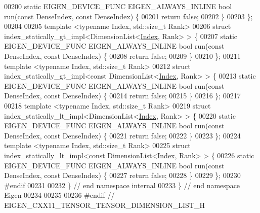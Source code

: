 \begin{DoxyCode}
00200   \textcolor{keyword}{static} EIGEN\_DEVICE\_FUNC EIGEN\_ALWAYS\_INLINE \textcolor{keywordtype}{bool} run(\textcolor{keyword}{const} DenseIndex, \textcolor{keyword}{const} DenseIndex) \{
00201     \textcolor{keywordflow}{return} \textcolor{keyword}{false};
00202   \}
00203 \};
00204 
00205 \textcolor{keyword}{template} <\textcolor{keyword}{typename} Index, std::\textcolor{keywordtype}{size\_t} Rank>
00206 \textcolor{keyword}{struct }index\_statically\_gt\_impl<DimensionList<\hyperlink{namespace_eigen_a62e77e0933482dafde8fe197d9a2cfde}{Index}, Rank> > \{
00207   \textcolor{keyword}{static} EIGEN\_DEVICE\_FUNC EIGEN\_ALWAYS\_INLINE \textcolor{keywordtype}{bool} run(\textcolor{keyword}{const} DenseIndex, \textcolor{keyword}{const} DenseIndex) \{
00208     \textcolor{keywordflow}{return} \textcolor{keyword}{false};
00209   \}
00210 \};
00211 \textcolor{keyword}{template} <\textcolor{keyword}{typename} Index, std::\textcolor{keywordtype}{size\_t} Rank>
00212 \textcolor{keyword}{struct }index\_statically\_gt\_impl<const DimensionList<\hyperlink{namespace_eigen_a62e77e0933482dafde8fe197d9a2cfde}{Index}, Rank> > \{
00213   \textcolor{keyword}{static} EIGEN\_DEVICE\_FUNC EIGEN\_ALWAYS\_INLINE \textcolor{keywordtype}{bool} run(\textcolor{keyword}{const} DenseIndex, \textcolor{keyword}{const} DenseIndex) \{
00214     \textcolor{keywordflow}{return} \textcolor{keyword}{false};
00215   \}
00216 \};
00217 
00218 \textcolor{keyword}{template} <\textcolor{keyword}{typename} Index, std::\textcolor{keywordtype}{size\_t} Rank>
00219 \textcolor{keyword}{struct }index\_statically\_lt\_impl<DimensionList<\hyperlink{namespace_eigen_a62e77e0933482dafde8fe197d9a2cfde}{Index}, Rank> > \{
00220   \textcolor{keyword}{static} EIGEN\_DEVICE\_FUNC EIGEN\_ALWAYS\_INLINE \textcolor{keywordtype}{bool} run(\textcolor{keyword}{const} DenseIndex, \textcolor{keyword}{const} DenseIndex) \{
00221     \textcolor{keywordflow}{return} \textcolor{keyword}{false};
00222   \}
00223 \};
00224 \textcolor{keyword}{template} <\textcolor{keyword}{typename} Index, std::\textcolor{keywordtype}{size\_t} Rank>
00225 \textcolor{keyword}{struct }index\_statically\_lt\_impl<const DimensionList<\hyperlink{namespace_eigen_a62e77e0933482dafde8fe197d9a2cfde}{Index}, Rank> > \{
00226   \textcolor{keyword}{static} EIGEN\_DEVICE\_FUNC EIGEN\_ALWAYS\_INLINE \textcolor{keywordtype}{bool} run(\textcolor{keyword}{const} DenseIndex, \textcolor{keyword}{const} DenseIndex) \{
00227     \textcolor{keywordflow}{return} \textcolor{keyword}{false};
00228   \}
00229 \};
00230 \textcolor{preprocessor}{#endif}
00231 
00232 \}  \textcolor{comment}{// end namespace internal}
00233 \}  \textcolor{comment}{// end namespace Eigen}
00234 
00235 
00236 \textcolor{preprocessor}{#endif // EIGEN\_CXX11\_TENSOR\_TENSOR\_DIMENSION\_LIST\_H}
\end{DoxyCode}
